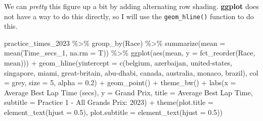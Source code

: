 \documentclass[
]{book}
\newenvironment{Shaded}{\begin{snugshade}}{\end{snugshade}}
\newcommand{\AttributeTok}[1]{\textcolor[rgb]{0.77,0.63,0.00}{#1}}
\newcommand{\DecValTok}[1]{\textcolor[rgb]{0.00,0.00,0.81}{#1}}
\newcommand{\FloatTok}[1]{\textcolor[rgb]{0.00,0.00,0.81}{#1}}
\newcommand{\FunctionTok}[1]{\textcolor[rgb]{0.00,0.00,0.00}{#1}}
\newcommand{\NormalTok}[1]{#1}
\newcommand{\SpecialCharTok}[1]{\textcolor[rgb]{0.00,0.00,0.00}{#1}}
\newcommand{\StringTok}[1]{\textcolor[rgb]{0.31,0.60,0.02}{#1}}
\begin{document}
We can \emph{pretty} this figure up a bit by adding alternating row shading. \textbf{ggplot} does not have a way to do this directly, so I will use the \texttt{geom\_hline()} function to do this.

\begin{Shaded}
\begin{Highlighting}[]
\NormalTok{practice\_times\_2023 }\SpecialCharTok{\%\textgreater{}\%}
  \FunctionTok{group\_by}\NormalTok{(Race) }\SpecialCharTok{\%\textgreater{}\%}
  \FunctionTok{summarize}\NormalTok{(}\AttributeTok{mean =} \FunctionTok{mean}\NormalTok{(Time\_secs\_1, }\AttributeTok{na.rm =}\NormalTok{ T)) }\SpecialCharTok{\%\textgreater{}\%}
  \FunctionTok{ggplot}\NormalTok{(}\FunctionTok{aes}\NormalTok{(mean, }\AttributeTok{y =} \FunctionTok{fct\_reorder}\NormalTok{(Race, mean))) }\SpecialCharTok{+}
  \FunctionTok{geom\_hline}\NormalTok{(}\AttributeTok{yintercept =} \FunctionTok{c}\NormalTok{(}\StringTok{\textquotesingle{}belgium\textquotesingle{}}\NormalTok{, }\StringTok{\textquotesingle{}azerbaijan\textquotesingle{}}\NormalTok{, }\StringTok{\textquotesingle{}united{-}states\textquotesingle{}}\NormalTok{, }\StringTok{\textquotesingle{}singapore\textquotesingle{}}\NormalTok{, }\StringTok{\textquotesingle{}miami\textquotesingle{}}\NormalTok{, }\StringTok{\textquotesingle{}great{-}britain\textquotesingle{}}\NormalTok{, }\StringTok{\textquotesingle{}abu{-}dhabi\textquotesingle{}}\NormalTok{, }\StringTok{\textquotesingle{}canada\textquotesingle{}}\NormalTok{, }\StringTok{\textquotesingle{}australia\textquotesingle{}}\NormalTok{, }\StringTok{\textquotesingle{}monaco\textquotesingle{}}\NormalTok{, }\StringTok{\textquotesingle{}brazil\textquotesingle{}}\NormalTok{), }\AttributeTok{col =} \StringTok{\textquotesingle{}grey\textquotesingle{}}\NormalTok{, }\AttributeTok{size =} \DecValTok{5}\NormalTok{, }\AttributeTok{alpha =} \FloatTok{0.2}\NormalTok{) }\SpecialCharTok{+} 
  \FunctionTok{geom\_point}\NormalTok{() }\SpecialCharTok{+}
    \FunctionTok{theme\_bw}\NormalTok{() }\SpecialCharTok{+}
  \FunctionTok{labs}\NormalTok{(}\AttributeTok{x =} \StringTok{\textquotesingle{}Average Best Lap Time (secs)\textquotesingle{}}\NormalTok{,}
       \AttributeTok{y =} \StringTok{\textquotesingle{}Grand Prix\textquotesingle{}}\NormalTok{,}
       \AttributeTok{title =} \StringTok{\textquotesingle{}Average Best Lap Time\textquotesingle{}}\NormalTok{,}
       \AttributeTok{subtitle =} \StringTok{\textquotesingle{}Practice 1 {-} All Grands Prix: 2023\textquotesingle{}}\NormalTok{) }\SpecialCharTok{+}
  \FunctionTok{theme}\NormalTok{(}\AttributeTok{plot.title =} \FunctionTok{element\_text}\NormalTok{(}\AttributeTok{hjust =} \FloatTok{0.5}\NormalTok{),}
        \AttributeTok{plot.subtitle =} \FunctionTok{element\_text}\NormalTok{(}\AttributeTok{hjust =} \FloatTok{0.5}\NormalTok{))}
\end{Highlighting}
\end{Shaded}
\end{document}
